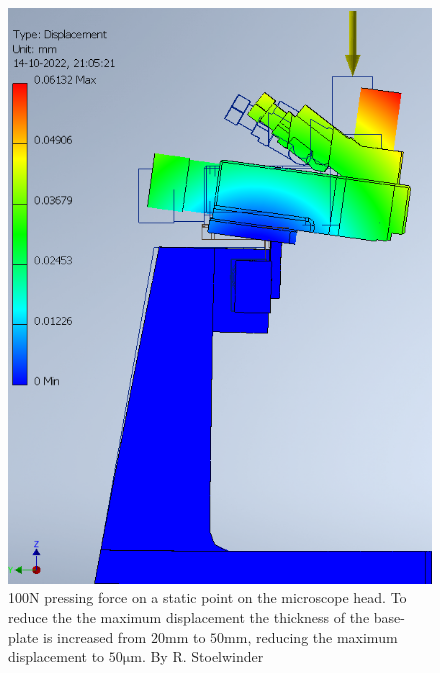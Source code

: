 \documentclass[11pt]{article}
\begin{document}
\begin{figure}[H]
\begin{minipage}[b]{0.45\textwidth}
    \includegraphics[width=\textwidth]{img/rigidity_simulation/study_7.png}
    \caption{100N pressing force on a static point on the microscope head. To reduce the the maximum displacement the thickness of the base-plate is increased from $20\mathrm{mm}$ to $50\mathrm{mm}$, reducing the maximum displacement to $50\mathrm{\mu m}$. By R. Stoelwinder}
    \label{fig:disp_study7}
  \end{minipage}
\end{figure}
\end{document}
